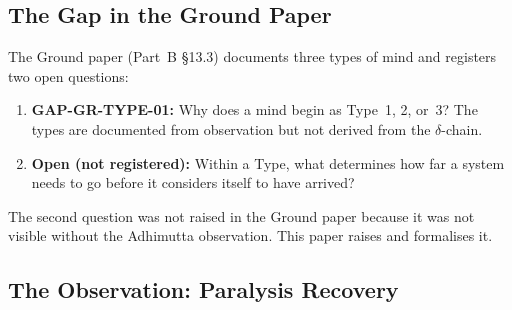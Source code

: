\documentclass[12pt, a4paper]{article}
\providecommand{\Bplus}{B_{+}}
\providecommand{\tbreak}{\theta_{\mathrm{break}}}
\begin{document}
\begin{abstract}
The Ground paper formalises three types of mind
$(h \in \{1,2,3\})$ with coordinate $(h,c,d)$ and
leaves open the question of why minds begin as
different types. This paper adds a fourth dimension
$\tbreak \in [0,1]$ --- the breakthrough threshold ---
which encodes not how much Barami a system has but
\emph{where it is directed}.

Two systems with identical $\|\Bplus\|$ may have
different $\tbreak$: one considers the goal achieved
at a modest recovery, another requires full capability.
Neither is more advanced; they are oriented differently.
The observation that motivates this paper: patients
recovering from paralysis set different recovery targets,
and the target is not a function of their current state
alone --- it is a function of accumulated direction.
\end{abstract}

\tableofcontents
\newpage

\subsection{The Gap in the Ground Paper}


The Ground paper (Part~B §13.3) documents three types of mind
and registers two open questions:

\begin{enumerate}[leftmargin=*, itemsep=2pt]
\item \textbf{GAP-GR-TYPE-01:} Why does a mind begin as
  Type~1, 2, or~3? The types are documented from observation
  but not derived from the $\delta$-chain.

\item \textbf{Open (not registered):} Within a Type, what
  determines how far a system needs to go before it considers
  itself to have arrived?
\end{enumerate}

The second question was not raised in the Ground paper because
it was not visible without the Adhimutta observation. This paper
raises and formalises it.

\subsection{The Observation: Paralysis Recovery}
\end{document}
